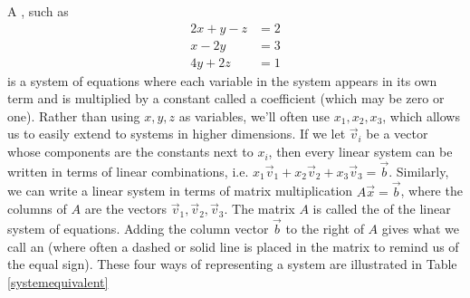 A , such as 
$$\begin{array}{rl}
2x+y-z&=2\\
x-2y &=3\\
4y+2z&=1
\end{array}$$ is a system of equations where each variable in the system appears in its own term and is multiplied by a constant called a coefficient (which may be zero or one).  
Rather than using {$x,y,z$} as variables, we'll often use $x_1, x_2, x_3$, which allows us to easily extend to systems in higher dimensions. 
If we let $\vec v_i$ be a vector whose components are the constants next to $x_i$, then every linear system can be written in terms of linear combinations, i.e. $x_1\vec v_1+ x_2\vec v_2 + x_3\vec v_3=\vec b$. 
Similarly, we can write a linear system in terms of matrix multiplication $A\vec x = \vec b$, where the columns of $A$ are the vectors $\vec v_1, \vec v_2, \vec v_3$. 
The matrix $A$ is called the  of the linear system of equations. 
Adding the column vector $\vec b$ to the right of $A$ gives what we call an  (where often a dashed or solid line is placed in the matrix to remind us of the equal sign). 
These four ways of representing a system are illustrated in Table \ref{systemequivalent}

